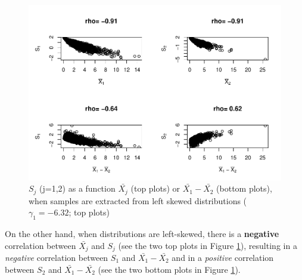 \documentclass[
  man]{apa6}
\begin{document}
\begin{figure}
\centering
\includegraphics{Correlations-between-the-sample-means-difference-and-standardizers-of-all-estimators,-and-implications-on-biases-and-variances-of-all-estimators_files/figure-latex/pltSDHombalLskew-1.pdf}
\caption{\label{fig:pltSDHombalLskew}\(S_j\) (j=1,2) as a function \(\bar{X_j}\) (top plots) or \(\bar{X_1}-\bar{X_2}\) (bottom plots), when samples are extracted from left skewed distributions (\(\gamma_1 = -6.32\); top plots)}
\end{figure}

On the other hand, when distributions are left-skewed, there is a \textbf{negative} correlation between \(\bar{X_j}\) and \(S_j\) (see the two top plots in Figure \ref{fig:pltSDHombalLskew}), resulting in a \emph{negative} correlation between \(S_1\) and \(\bar{X_1}-\bar{X_2}\) and in a \emph{positive} correlation between \(S_2\) and \(\bar{X_1}-\bar{X_2}\) (see the two bottom plots in Figure \ref{fig:pltSDHombalLskew}).
\end{document}
